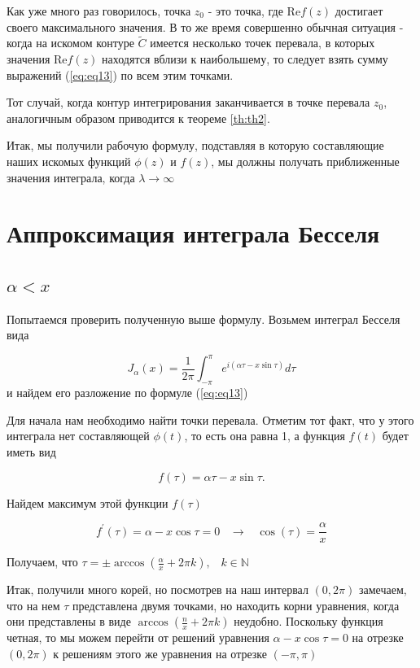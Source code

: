 \documentclass[14pt]{extarticle}
\renewcommand{\Re}{\mathrm{Re}}
\begin{document}
Как уже много раз говорилось, точка $z_0$ - это точка, где $\Re f(z)$ достигает своего максимального значения. В то же время совершенно обычная ситуация - когда на искомом контуре $\widetilde{C}$ имеется несколько точек перевала, в которых значения $\Re f (z)$ находятся вблизи к наибольшему, то следует взять сумму выражений (\ref{eq:eq13}) по всем этим точками. 

Тот случай, когда контур интегрирования заканчивается в точке перевала $z_0$, аналогичным образом приводится к теореме \ref{th:th2}.

Итак, мы получили рабочую формулу, подставляя в которую составляющие наших искомых функций $\phi (z)$ и $f (z)$, мы должны получать приближенные значения интеграла, когда $\lambda \rightarrow \infty$ 

\section{Аппроксимация интеграла Бесселя}
\subsection{$\alpha<x$}
Попытаемся проверить полученную выше формулу. Возьмем интеграл Бесселя вида 

\begin{equation}\label{eq:eq14}
J_\alpha(x)=\frac{1}{2\pi}\int_{-\pi}^{\pi}e^{i(\alpha\tau-x\sin\tau)}d\tau
\end{equation} 
и найдем его разложение по формуле (\ref{eq:eq13})

Для начала нам необходимо найти точки перевала. Отметим тот факт, что у этого интеграла нет составляющей $\phi(t)$, то есть она равна 1, а функция $f(t)$ будет иметь вид 

\begin{equation}\nonumber
f(\tau) = \alpha \tau - x \sin \tau.
\end{equation} 

Найдем максимум этой функции $f(\tau)$

\begin{equation}\label{eq:eq15}
f^\prime(\tau) = \alpha - x \cos \tau = 0 \;\;\; \rightarrow \;\;\; \cos(\tau)=\frac{\alpha}{x}
\end{equation} 

Получаем, что $\tau = \pm \arccos\left(\frac{\alpha}{x} + 2\pi k \right), \;\;\; k \in \mathbb{N}$

Итак, получили много корей, но посмотрев на наш интервал $(0, 2\pi)$ замечаем, что на нем $\tau$ представлена двумя точками, но находить корни уравнения, когда они представлены в виде $\arccos\left(\frac{n}{x} + 2\pi k \right)$ неудобно. Поскольку функция четная, то мы можем перейти от решений уравнения $\alpha - x \cos \tau = 0$ на отрезке $(0, 2\pi)$ к решениям этого же уравнения на отрезке $(-\pi, \pi)$
\end{document}
